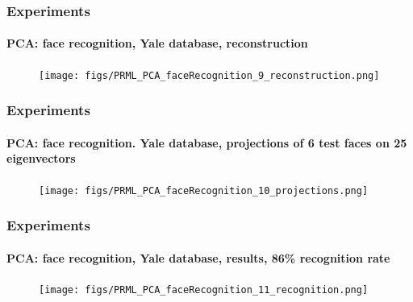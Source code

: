 \begin{frame}
\frametitle{Experiments}
\framesubtitle{PCA: face recognition, Yale database, reconstruction}
\logoCSIPCPL\mypagenum	
	\begin{figure}
		\texttt{[image: figs/PRML\_PCA\_faceRecognition\_9\_reconstruction.png]}
	\end{figure}
\end{frame}


\begin{frame}
\frametitle{Experiments}
\framesubtitle{PCA: face recognition. Yale database, projections of 6 test faces on 25 eigenvectors}
\logoCSIPCPL\mypagenum	
	\begin{figure}
		\texttt{[image: figs/PRML\_PCA\_faceRecognition\_10\_projections.png]}
	\end{figure}
\end{frame}

\begin{frame}
\frametitle{Experiments}
\framesubtitle{PCA: face recognition, Yale database, results, 86\% recognition rate}
\logoCSIPCPL\mypagenum	
	\begin{figure}
		\texttt{[image: figs/PRML\_PCA\_faceRecognition\_11\_recognition.png]}
	\end{figure}
\end{frame}



\printbibliography




 



